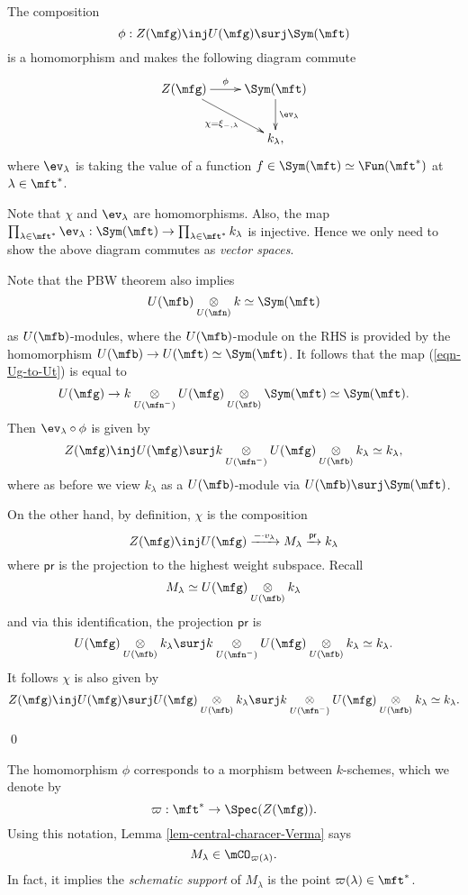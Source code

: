 \begin{lem}
	\label{lem-HC-map}
	The composition 
	\[
		\phi:Z(\mfg) \inj U(\mfg) \surj \Sym(\mft)
	\]
	is a homomorphism and makes the following diagram commute
	\[
		\xymatrix{
			Z(\mfg) 
				\ar[r]^-\phi
				\ar[rd]_-{\chi=\xi_{-,\lambda}}
			& \Sym(\mft) \ar[d]^-{\ev_\lambda} \\
			& k_\lambda,
		}
	\]
	where $\ev_\lambda$ is taking the value of a function $f\in \Sym(\mft)\simeq \Fun(\mft^*)$ at $\lambda\in \mft^*$.
\end{lem}

\proof
	Note that $\chi$ and $\ev_\lambda$ are homomorphisms. Also, the map $\prod_{\lambda\in \mft^*} \ev_\lambda: \Sym(\mft) \to \prod_{\lambda\in \mft^*} k_\lambda$ is injective. Hence we only need to show the above diagram commutes as \emph{vector spaces}.

	Note that the PBW theorem also implies
	\[
		U(\mfb)\ot_{U(\mfn)} k \simeq \Sym(\mft)
	\]
	as $U(\mfb)$-modules, where the $U(\mfb)$-module on the RHS is provided by the homomorphism $U(\mfb) \to U(\mft)\simeq \Sym(\mft)$. It follows that the map (\ref{eqn-Ug-to-Ut}) is equal to
	\[
		U(\mfg) \to k \ot_{U(\mfn^-)} U(\mfg) \ot_{U(\mfb)} \Sym(\mft) \simeq \Sym(\mft).
	\]
	Then $\ev_\lambda\circ \phi$ is given by
	\[
		Z(\mfg)\inj U(\mfg) \surj k \ot_{U(\mfn^-)} U(\mfg) \ot_{U(\mfb)} k_\lambda \simeq k_\lambda,
	\]
	where as before we view $k_\lambda$ as a $U(\mfb)$-module via $U(\mfb)\surj \Sym(\mft)$.

	On the other hand, by definition, $\chi$ is the composition
	\[
		Z(\mfg) \inj U(\mfg) \xrightarrow{-\cdot v_\lambda} M_\lambda \xrightarrow{\mathsf{pr}} k_\lambda
	\]
	where $\mathsf{pr}$ is the projection to the highest weight subspace. Recall
	\[
		M_\lambda \simeq U(\mfg) \ot_{U(\mfb)} k_\lambda
	\]
	and via this identification, the projection $\mathsf{pr}$ is
	\[
		U(\mfg) \ot_{U(\mfb)} k_\lambda \surj k \ot_{U(\mfn^-)} U(\mfg) \ot_{U(\mfb)} k_\lambda \simeq k_\lambda.
	\]
	It follows $\chi$ is also given by
	\[
		Z(\mfg) \inj U(\mfg) \surj U(\mfg) \ot_{U(\mfb)} k_\lambda \surj k \ot_{U(\mfn^-)} U(\mfg) \ot_{U(\mfb)} k_\lambda \simeq k_\lambda.
	\]
	
\qed


\begin{notn}
	The homomorphism $\phi$ corresponds to a morphism between $k$-schemes, which we denote by
	\[
		\varpi: \mft^* \to \Spec(Z(\mfg)).
	\]
	Using this notation, Lemma \ref{lem-central-characer-Verma} says
	\[
		M_\lambda \in \mCO_{\varpi(\lambda)}.
	\]
	In fact, it implies the \emph{schematic support} of $M_\lambda$ is the point $\varpi(\lambda)\in \mft^*$.
\end{notn}

